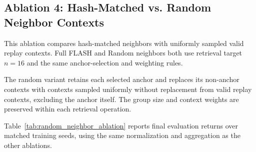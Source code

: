 \documentclass{article} %
\begin{document}
\FloatBarrier

\subsection{Ablation 4: Hash-Matched vs. Random Neighbor Contexts}
\label{subsec:random_neighbor_ablation}

This ablation compares hash-matched neighbors with uniformly sampled valid replay contexts. Full FLASH and Random neighbors both use retrieval target $n=16$ and the same anchor-selection and weighting rules.

The random variant retains each selected anchor and replaces its non-anchor contexts with contexts sampled uniformly without replacement from valid replay contexts, excluding the anchor itself. The group size and context weights are preserved within each retrieval operation.

Table~\ref{tab:random_neighbor_ablation} reports final evaluation returns over matched training seeds, using the same normalization and aggregation as the other ablations.
\end{document}
